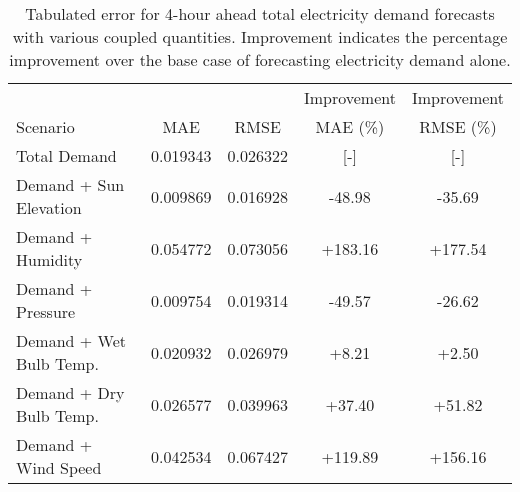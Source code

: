  \begin{table*}[t]
    \centering
    \caption{Tabulated error for 4-hour ahead total electricity demand forecasts with various coupled quantities. Improvement indicates the percentage improvement over the base case of forecasting electricity demand alone.}
    \label{tab:demand04}
    \begin{tabular}{l|c|c|c|c}
      &  & & Improvement & Improvement \\
      Scenario  & MAE & RMSE & MAE (\%) & RMSE (\%)\\
      \hline
      Total Demand & 0.019343 & 0.026322 & [-] & [-] \\
      Demand + Sun Elevation & 0.009869 & 0.016928 & -48.98 & -35.69\\
      Demand + Humidity & 0.054772 & 0.073056 & +183.16& +177.54\\
      Demand + Pressure & 0.009754 & 0.019314 & -49.57& -26.62\\
      Demand + Wet Bulb Temp. & 0.020932 & 0.026979 & +8.21& +2.50\\
      Demand + Dry Bulb Temp. & 0.026577 & 0.039963 & +37.40&+51.82\\
      Demand + Wind Speed & 0.042534 & 0.067427 &+119.89 &+156.16\\
    \end{tabular}
  \end{table*}
